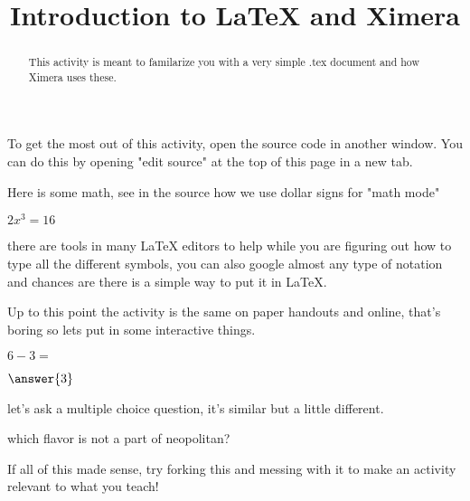 \documentclass{ximera}%
\title{Introduction to LaTeX and Ximera}%
\begin{document}
\begin{abstract}
This activity is meant to familarize you with a very simple .tex document and how Ximera uses these. 
\end{abstract}
\maketitle %
To get the most out of this activity, open the source code in another window. You can do this by opening "edit source" at the top of this page in a new tab. 

Here is some math, see in the source how we use dollar signs for "math mode"
 
$2x^3=16$

there are tools in many LaTeX editors to help while you are figuring out how to type all the different symbols, you can also google almost any type of notation and chances are there is a simple way to put it in LaTeX.

Up to this point the activity is the same on paper handouts and online, that's boring so lets put in some interactive things.


\begin{question} $6-3=$ 
\begin{prompt}$\answer{3}$
\end{prompt}
\end{question}


let's ask a multiple choice question, it's similar but a little different.

\begin{question} which flavor is not a part of neopolitan?
\begin{multipleChoice}
\end{multipleChoice}
\end{question}

If all of this made sense, try forking this and messing with it to make an activity relevant to what you teach!
\end{document}
